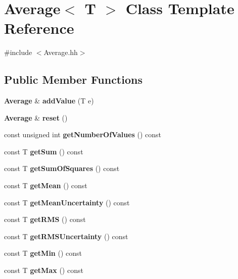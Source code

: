 \section{Average$<$ T $>$ Class Template Reference}
\label{classAverage}


{\ttfamily \#include $<$Average.\-hh$>$}

\subsection*{Public Member Functions}
\begin{DoxyCompactItemize}
\item 
{\bf Average} \& {\bfseries add\-Value} (T e)\label{classAverage_a64c7ca209a62c3924c39b4164aa867d0}

\item 
{\bf Average} \& {\bfseries reset} ()\label{classAverage_a838a42f6d0f3cf73165309f02b094e9b}

\item 
const unsigned int {\bfseries get\-Number\-Of\-Values} () const \label{classAverage_a2ee713a278aefaef90584bbf73596edf}

\item 
const T {\bfseries get\-Sum} () const \label{classAverage_a560bb0d9ca4b0f40fcae27223aae0a90}

\item 
const T {\bfseries get\-Sum\-Of\-Squares} () const \label{classAverage_af6dfd62fc21b2df27ac5dfbaa4ad1d83}

\item 
const T {\bfseries get\-Mean} () const \label{classAverage_a61076cc700c867dfb4f3219b00e70c6e}

\item 
const T {\bfseries get\-Mean\-Uncertainty} () const \label{classAverage_a457c11776ddaa9774dded83e548bb57b}

\item 
const T {\bfseries get\-R\-M\-S} () const \label{classAverage_a19cd90c555f3b31e217dd01c2d076581}

\item 
const T {\bfseries get\-R\-M\-S\-Uncertainty} () const \label{classAverage_a6295f4a7c39dc1b659d917839e2c705f}

\item 
const T {\bfseries get\-Min} () const \label{classAverage_a94b13ed6b3b4e09ffc783246c8951469}

\item 
const T {\bfseries get\-Max} () const \label{classAverage_ab3da04cdf4d87f82c0a5f1dc1310d414}

\end{DoxyCompactItemize}
